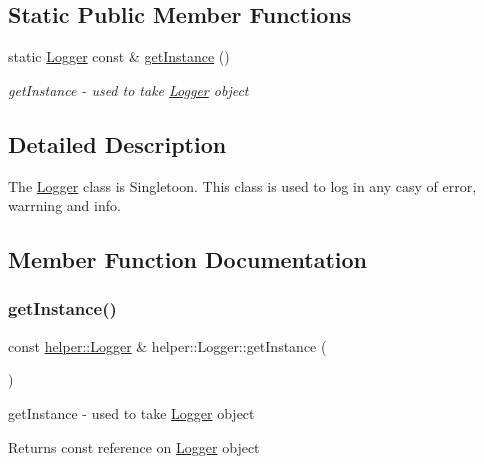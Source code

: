 \subsection*{Static Public Member Functions}
\begin{DoxyCompactItemize}
\item 
static \mbox{\hyperlink{classhelper_1_1_logger}{Logger}} const  \& \mbox{\hyperlink{classhelper_1_1_logger_ad83c355f624e02e4b820cf5a9db1cf2d}{get\+Instance}} ()
\begin{DoxyCompactList}\small\item\em get\+Instance -\/ used to take \mbox{\hyperlink{classhelper_1_1_logger}{Logger}} object \end{DoxyCompactList}\end{DoxyCompactItemize}


\subsection{Detailed Description}
The \mbox{\hyperlink{classhelper_1_1_logger}{Logger}} class is Singletoon. This class is used to log in any casy of error, warrning and info. 

\subsection{Member Function Documentation}
\mbox{\label{classhelper_1_1_logger_ad83c355f624e02e4b820cf5a9db1cf2d}} 
\subsubsection{\texorpdfstring{getInstance()}{getInstance()}}
{\footnotesize\ttfamily const \mbox{\hyperlink{classhelper_1_1_logger}{helper\+::\+Logger}} \& helper\+::\+Logger\+::get\+Instance (\begin{DoxyParamCaption}{ }\end{DoxyParamCaption})\hspace{0.3cm}{\ttfamily [static]}}



get\+Instance -\/ used to take \mbox{\hyperlink{classhelper_1_1_logger}{Logger}} object 

\begin{DoxyReturn}{Returns}
const reference on \mbox{\hyperlink{classhelper_1_1_logger}{Logger}} object 
\end{DoxyReturn}
\mbox{\label{classhelper_1_1_logger_aefbd6da65fd1a5326019ae5445bd0bc8}} 
